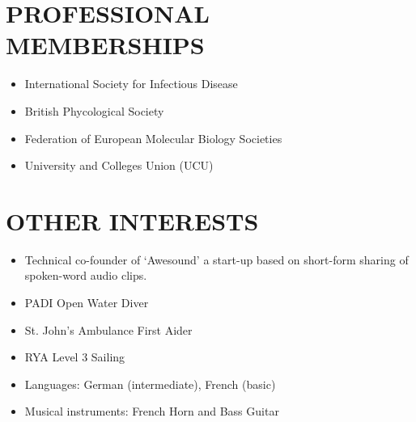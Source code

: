 \documentclass{res}
\begin{document}
\begin{resume}
\begin{itemize}
    \end{itemize}


 \section{PROFESSIONAL MEMBERSHIPS}
          \vspace{-1pt}
 \begin{itemize}
\item International Society for Infectious Disease
\item British Phycological Society
\item Federation of European Molecular Biology Societies
\item University and Colleges Union (UCU)
\end{itemize}


	
 \section{OTHER INTERESTS}
          \vspace{-1pt}
 \begin{itemize}
     \item Technical co-founder of `Awesound' a start-up 
         based on short-form sharing of spoken-word audio clips.
     \item PADI Open Water Diver
     \item St. John's Ambulance First Aider
     \item RYA Level 3 Sailing
     \item Languages: German (intermediate), French (basic)
     \item Musical instruments: French Horn and Bass Guitar
 \end{itemize}
\end{resume}
\end{document}
